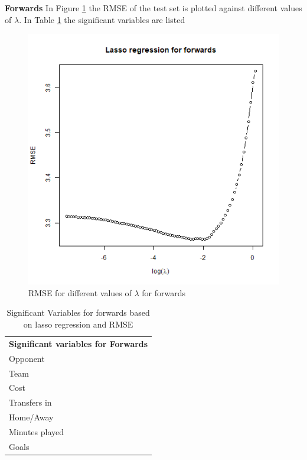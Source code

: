 \textbf{Forwards}
In Figure \ref{fig:lasso_FWD} the RMSE of the test set is plotted against different values of $\lambda$. In Table \ref{tab:sig_var_FWD} the significant variables are listed

\begin{figure}[H]
    \centering
    \includegraphics[scale=0.55]{fig/chapter_6/lasso_FWD.png}
    \caption{RMSE for different values of $\lambda$ for forwards}
\label{fig:lasso_FWD}    
\end{figure}

\begin{table}[H]
\centering
\caption{Significant Variables for forwards based on lasso regression and RMSE}
\label{tab:sig_var_FWD}
\begin{tabular}{l}
\textbf{Significant variables for Forwards}\\
Opponent                              \\
Team                                  \\
Cost                                  \\
Transfers in                          \\
Home/Away                             \\
Minutes played                        \\
Goals

\end{tabular}
\end{table}


